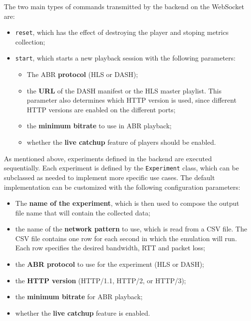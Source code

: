 The two main types of commands transmitted by the backend on the WebSocket are:

\begin{itemize}
    \item \texttt{reset}, which has the effect of destroying the player and stoping metrics collection;
    \item \texttt{start}, which starts a new playback session with the following parameters:
    \begin{itemize}
        \item The ABR \textbf{protocol} (HLS or DASH);
        \item the \textbf{URL} of the DASH manifest or the HLS master playlist. This parameter also determines which HTTP version is used, since different HTTP versions are enabled on the different ports;
        \item the \textbf{minimum bitrate} to use in ABR playback;
        \item whether the \textbf{live catchup} feature of players should be enabled.
    \end{itemize}
\end{itemize}

As mentioned above, experiments defined in the backend are executed sequentially. Each experiment is defined by the \texttt{Experiment} class, which can be subclassed as needed to implement more specific use cases. The default implementation can be customized with the following configuration parameters:

\begin{itemize}
    \item The \textbf{name of the experiment}, which is then used to compose the output file name that will contain the collected data;
    \item the name of the \textbf{network pattern} to use, which is read from a CSV file. The CSV file contains one row for each second in which the emulation will run. Each row specifies the desired bandwidth, RTT and packet loss;
    \item the \textbf{ABR protocol} to use for the experiment (HLS or DASH);
    \item the \textbf{HTTP version} (HTTP/1.1, HTTP/2, or HTTP/3);
    \item the \textbf{minimum bitrate} for ABR playback;
    \item whether the \textbf{live catchup} feature is enabled.
\end{itemize}

